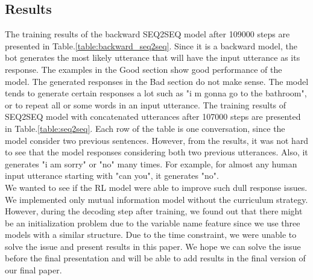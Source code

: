 \documentclass[letterpaper]{article}
\begin{document}
\subsection{Results}
The training results of the backward SEQ2SEQ model after 109000 steps are presented in Table.\ref{table:backward_seq2seq}. Since it is a backward model, the bot generates the most likely utterance that will have the input utterance as its response. The examples in the Good section show good performance of the model. The generated responses in the Bad section do not make sense. The model tends to generate certain responses a lot such as "i m gonna go to the bathroom", or to repeat all or some words in an input utterance. The training results of SEQ2SEQ model with concatenated utterances after 107000 steps are presented in Table.\ref{table:seq2seq}. Each row of the table is one conversation, since the model consider two previous sentences. However, from the results, it was not hard to see that the model responses considering both two previous utterances. Also, it generates "i am sorry" or "no" many times. For example, for almost any human input utterance starting with "can you", it generates "no". \\
We wanted to see if the RL model were able to improve such dull response issues. We implemented only mutual information model without the curriculum strategy. However, during the decoding step after training, we found out that there might be an initialization problem due to the variable name feature since we use three models with a similar structure. Due to the time constraint, we were unable to solve the issue and present results in this paper. We hope we can solve the issue before the final presentation and will be able to add results in the final version of our final paper.
\end{document}
